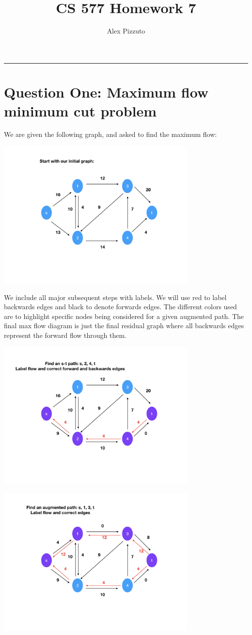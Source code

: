 \documentclass[11pt,letterpaper]{article}
\author{Alex Pizzuto}
\title{CS 577 Homework 7}
\begin{document}
\date{}
\maketitle
\hrule

\section*{Question One: Maximum flow minimum cut problem}
We are given the following graph, and asked to find the maximum flow: 

\includegraphics[width=10cm]{Graph1.jpeg}

We include all major subsequent steps with labels. We will use red to label backwards edges and black to denote forwards edges. The different colors used are to highlight specific nodes being considered for a given augmented path. The final max flow diagram is just the final residual graph where all backwards edges represent the forward flow through them. 

\includegraphics[width=10cm]{Graph2.jpeg}

\includegraphics[width=10cm]{Graph3.jpeg}
\end{document}
